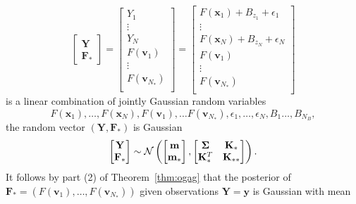 \begin{equation*}
    \begin{bmatrix}
        \mathbf{Y} \\
        \mathbf{F}_{*}
    \end{bmatrix}
    =
    \begin{bmatrix}
        Y_1 \\
        \vdots \\
        Y_N \\
        F(\mathbf{v}_1) \\
        \vdots \\
        F(\mathbf{v}_{N_{*}}) \\
    \end{bmatrix}
    =
    \begin{bmatrix}
        F(\mathbf{x}_1) + B_{z_1} + \epsilon_1 \\
        \vdots \\
        F(\mathbf{x}_N) + B_{z_N} + \epsilon_N \\
        F(\mathbf{v}_1) \\
        \vdots \\
        F(\mathbf{v}_{N_{*}}) \\
    \end{bmatrix}
\end{equation*}
is a linear combination of jointly Gaussian random variables
\begin{equation*}
    F(\mathbf{x}_1), \dots, F(\mathbf{x}_N), F(\mathbf{v}_1), \dots F(\mathbf{v}_{N_*}), \epsilon_1, \dots, \epsilon_N, B_1 \dots, B_{N_B},
\end{equation*}
the random vector $(\mathbf{Y}, \mathbf{F}_*)$ is Gaussian
\begin{equation*}
    \begin{bmatrix}
        \mathbf{Y} \\
        \mathbf{F}_*
    \end{bmatrix}
    \sim
    \mathcal{N}\left(
    \begin{bmatrix}
            \mathbf{m} \\
            \mathbf{m}_*
        \end{bmatrix}
    ,
    \begin{bmatrix}
            \boldsymbol{\Sigma} & \mathbf{K}_* \\
            \mathbf{K}_*^T & \mathbf{K}_{* *}
        \end{bmatrix}
    \right).
\end{equation*}
It follows by part (2) of Theorem~\ref{thm:ogag} that the posterior of $\mathbf{F}_* = (F(\mathbf{v}_1), \dots, F(\mathbf{v}_{N_*}))$ given observations $\mathbf{Y} = \mathbf{y}$ is Gaussian with mean
